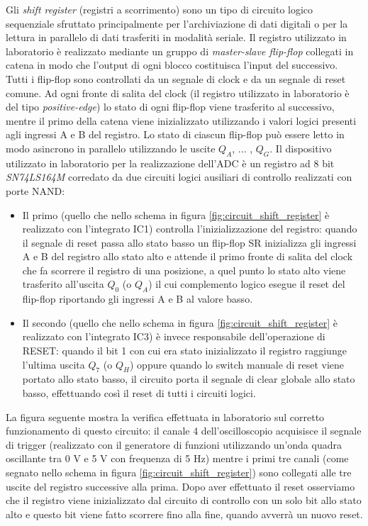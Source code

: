 \documentclass[journal]{IEEEtran}
\begin{document}
Gli \textit{shift register} (registri a scorrimento) sono un tipo di circuito logico sequenziale sfruttato principalmente per l'archiviazione di dati digitali o per la lettura in parallelo di dati trasferiti in modalità seriale. Il registro utilizzato in laboratorio è realizzato mediante un gruppo di \textit{master-slave flip-flop} collegati in catena in modo che l'output di ogni blocco costituisca l'input del successivo. Tutti i flip-flop sono controllati da un segnale di clock e da un segnale di reset comune.
Ad ogni fronte di salita del clock (il registro utilizzato in laboratorio è del tipo \textit{positive-edge}) lo stato di ogni flip-flop viene trasferito al successivo, mentre il primo della catena viene inizializzato utilizzando i valori logici presenti agli ingressi A e B del registro. Lo stato di ciascun flip-flop può essere letto in modo asincrono in parallelo utilizzando le uscite {$Q_A$, ... , $Q_G$}. Il dispositivo utilizzato in laboratorio per la realizzazione dell'ADC è un registro ad 8 bit \textit{SN74LS164M} corredato da due circuiti logici ausiliari di controllo realizzati con porte NAND:
\begin{itemize}
    \item Il primo (quello che nello schema in figura \ref{fig:circuit_shift_register} è realizzato con l'integrato IC1) controlla l'inizializzazione del registro: quando il segnale di reset passa allo stato basso un flip-flop SR inizializza gli ingressi A e B del registro allo stato alto e attende il primo fronte di salita del clock che fa scorrere il registro di una posizione, a quel punto lo stato alto viene trasferito all'uscita $Q_0$ (o $Q_A$) il cui complemento logico esegue il reset del flip-flop riportando gli ingressi A e B al valore basso. 
    \item Il secondo (quello che nello schema in figura \ref{fig:circuit_shift_register} è realizzato con l'integrato IC3) è invece responsabile dell'operazione di RESET: quando il bit 1 con cui era stato inizializzato il registro raggiunge l'ultima uscita $Q_7$ (o $Q_H$) oppure quando lo switch manuale di reset viene portato allo stato basso, il circuito porta il segnale di clear globale allo stato basso, effettuando così il reset di tutti i circuiti logici.
\end{itemize}

La figura seguente mostra la verifica effettuata in laboratorio sul corretto funzionamento di questo circuito: il canale 4 dell'oscilloscopio acquisisce il segnale di trigger (realizzato con il generatore di funzioni utilizzando un'onda quadra oscillante tra 0 V e 5 V con frequenza di 5 Hz) mentre i primi tre canali (come segnato nello schema in figura \ref{fig:circuit_shift_register}) sono collegati alle tre uscite del registro successive alla prima. Dopo aver effettuato il reset osserviamo che il registro viene inizializzato dal circuito di controllo con un solo bit allo stato alto e questo bit viene fatto scorrere fino alla fine, quando avverrà un nuovo reset. 
\end{document}
